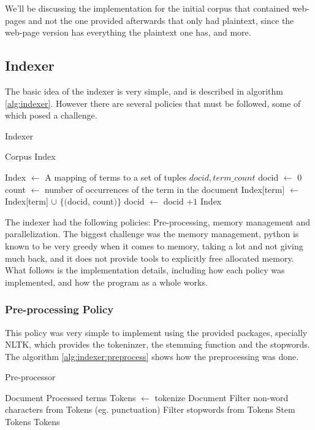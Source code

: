 \documentclass[sigconf,authorversion,nonacm]{acmart}
\begin{document}
We'll be discussing the implementation for the initial corpus that contained web-pages and not the one provided afterwards that only had plaintext, since the web-page version has everything the plaintext one has, and more.

\subsection{Indexer}

The basic idea of the indexer is very simple, and is described in algorithm \ref{alg:indexer}. However there are several policies that must be followed, some of which posed a challenge.

\begin{algorithm}
  \caption{Indexer}\label{alg:indexer}
  \begin{algorithmic}
    \Require Corpus
    \Ensure Index

    \State Index $\gets$ A mapping of terms to a set of tuples \(docid, term\_count\)
    \state docid $\gets$ 0
    \State count $\gets$ number of occurrences of the term in the document
    \State Index[term] $\gets$ Index[term] $\cup$ $\{($docid, count$)\}$
    \EndFor
    \State docid $\gets$ docid $+ 1$
    \EndFor
    \State \Return Index
  \end{algorithmic}


\end{algorithm}

The indexer had the following policies: Pre-processing, memory management and parallelization. The biggest challenge was the memory management, python is known to be very greedy when it comes to memory, taking a lot and not giving much back, and it does not provide tools to explicitly free allocated memory. What follows is the implementation details, including how each policy was implemented, and how the program as a whole works.

\subsubsection{Pre-processing Policy}

This policy was very simple to implement using the provided packages, specially NLTK, which provides the tokeninzer, the stemming function and the stopwords. The algorithm \ref{alg:indexer:preprocess} shows how the preprocessing was done.

\begin{algorithm}
  \caption{Pre-processor}\label{alg:indexer:preprocess}
  \begin{algorithmic}
    \Require Document
    \Ensure Processed terms
    \State Tokens $\gets$ tokenize Document
    \State Filter non-word characters from Tokens (eg. punctuation)
    \State Filter stopwords from Tokens
    \State Stem Tokens
    \State \Return Tokens
  \end{algorithmic}
\end{algorithm}
\end{document}
